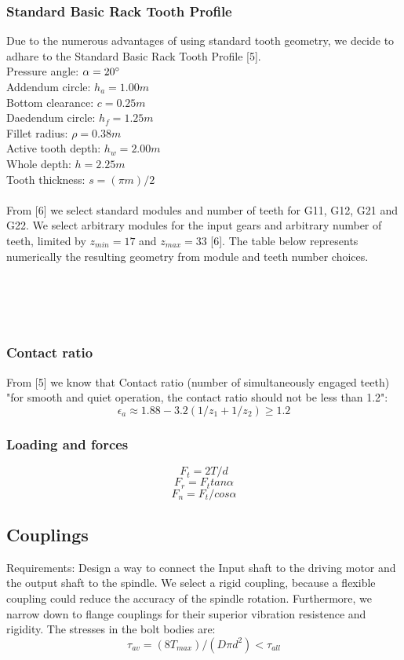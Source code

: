 \documentclass{article}
\begin{document}
\subsubsection{Standard Basic Rack Tooth Profile}
Due to the numerous advantages of using standard tooth geometry, we decide to adhare to the Standard Basic Rack Tooth Profile [5]. \\
Pressure angle: $\alpha = 20\degree$  \\
Addendum circle: $h_a = 1.00m$ \\
Bottom clearance: $c = 0.25m$ \\
Daedendum circle: $h_f = 1.25m$ \\
Fillet radius: $\rho = 0.38m$ \\
Active tooth depth: $h_w = 2.00m$ \\
Whole depth: $h = 2.25m$ \\
Tooth thickness: $s = (\pi m)/ 2$ \\
\\
From [6] we select standard modules and number of teeth for G11, G12, G21 and G22.
We select arbitrary modules for the input gears and arbitrary number of teeth, limited by $z_{min} = 17$ and $z_{max} = 33$ [6].
The table below represents numerically the resulting geometry from module and teeth number choices. \\
 \\
 \\
   \\
   \\
\subsubsection{Contact ratio} %
From [5] we know that Contact ratio (number of simultaneously engaged teeth) "for smooth and quiet operation, the contact ratio should not be less than 1.2":
$$\epsilon_a \approx 1.88 - 3.2 (1/z_1 + 1/z_2) \geq 1.2$$
\subsubsection{Loading and forces}
$$F_t = 2T / d$$ %
$$F_r = F_t tan\alpha$$
$$F_n = F_t / cos \alpha $$ %

\subsection{Couplings}
Requirements: Design a way to connect the Input shaft to the driving motor and the output shaft to the spindle.
We select a rigid coupling, because a flexible coupling could reduce the accuracy of the spindle rotation.
Furthermore, we narrow down to flange couplings for their superior vibration resistence and rigidity.
The stresses in the bolt bodies are:
$$\tau_{av} = (8 T_{max}) / (D \pi d^2) < \tau_{all}$$  %
\end{document}
